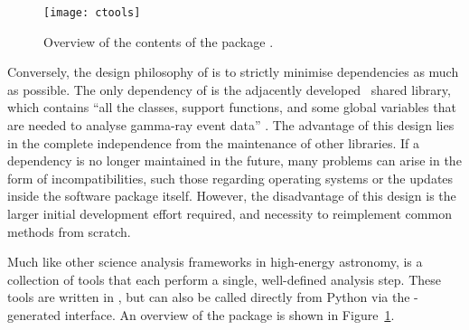 \begin{figure}[t]
  \centering
  \texttt{[image: ctools]}
  \caption[Overview of .]{Overview of the contents of the  package \cite{Knodlseder2016}.}
  \label{fig:ctools}
\end{figure}

\noindent Conversely, the design philosophy of  is to strictly minimise dependencies as much as possible. The only dependency of  is the adjacently developed  \cpp~shared library, which contains ``all the classes, support functions, and some global variables that are needed to analyse gamma-ray event data'' \cite[][p. 2]{Knodlseder2016}. The advantage of this design lies in the complete independence from the maintenance of other libraries. If a dependency is no longer maintained in the future, many problems can arise in the form of incompatibilities, such those regarding operating systems or the updates inside the software package itself. However, the disadvantage of this design is the larger initial development effort required, and necessity to reimplement common methods from scratch.

Much like other science analysis frameworks in high-energy astronomy,  is a collection of tools that each perform a single, well-defined analysis step. These tools are written in \cpp, but can also be called directly from Python via the -generated interface. An overview of the  package is shown in Figure~\ref{fig:ctools}.

